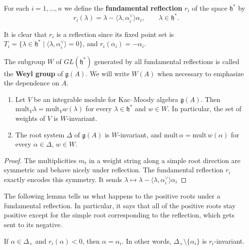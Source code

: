 \documentclass[12pt]{article}
\begin{document}
\begin{definition}
    For each $i=1,\dots,n$ we define the
    \textbf{fundamental reflection} $r_i$ of the space $\mathfrak{h}^*$ by
    \[
        r_i(\lambda) = \lambda - \langle \lambda,\alpha_i^\vee\rangle \alpha_i,
        \qquad \lambda \in \mathfrak{h}^*.
    \]

    It is clear that $r_i$ is a reflection since its fixed point set is  $T_i = \{ \lambda \in \mathfrak{h}^* \mid \langle \lambda,\alpha_i^\vee\rangle=0\}$,
    and $r_i(\alpha_i) = -\alpha_i$.

    The subgroup $W$ of $GL(\mathfrak{h}^*)$ generated by all fundamental reflections
    is called the \textbf{Weyl group} of $\mathfrak{g}(A)$. We will write $W(A)$ when
    necessary to emphasize the dependence on $A$.
\end{definition}

\begin{proposition}\label{prop:Weyl-invariance}
    \leavevmode
    \begin{enumerate}[label=(\alph*)]
        \item Let $V$ be an integrable module for Kac--Moody algebra $\mathfrak{g}(A)$.
              Then $\mathrm{mult}_V \lambda = \mathrm{mult}_V w(\lambda)$ for every
              $\lambda \in \mathfrak{h}^*$ and $w\in W$. In particular, the set of weights of $V$
              is $W$-invariant.

        \item The root system $\Delta$ of $\mathfrak{g}(A)$ is $W$-invariant, and
              $\mathrm{mult}\,\alpha = \mathrm{mult}\,w(\alpha)$ for every
              $\alpha \in \Delta$, $w\in W$.
    \end{enumerate}
\end{proposition}

\begin{proof}The multiplicities $m_t$ in a weight string along a simple root direction are symmetric and behave nicely under reflection. The fundamental reflection $r_i$ exactly encodes this symmetry. It sends
    $\lambda \mapsto \lambda - \langle \lambda,\alpha_i^\vee \rangle \alpha_i$
\end{proof}

The following lemma tells us what happens to the positive roots under a fundamental reflection. In particular, it says that all of the positive roots stay positive except for the simple root corresponding to the reflection, which gets sent to its negative.
\begin{lemma}\label{lem:3.7}
    If $\alpha \in \Delta_+$ and $r_i(\alpha) < 0$, then $\alpha = \alpha_i$.
    In other words, $\Delta_+ \setminus \{\alpha_i\}$ is $r_i$-invariant.
\end{lemma}
\end{document}
